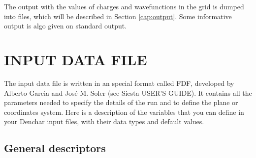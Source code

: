  The output with the values of charges and wavefunctions
 in the grid is dumped into files, which will be described
 in Section \ref{cap:output}. Some informative output is
 algo given on standard output.

\section{INPUT DATA FILE}
\label{cap:input} 

The input data file is written in an special format called FDF, developed
by Alberto Garc\'{\i}a and Jos\'e M. Soler (see {\sc Siesta} USER'S GUIDE).
It contains all the parameters needed to specify the details
of the run and to define the plane or coordinates system.
Here is a description of the variables that you can define in your 
{\sc Denchar} input files,
with their data types and default values.

\vspace{5pt}
\subsection{General descriptors}


